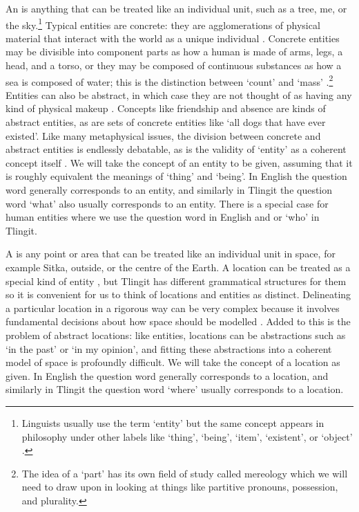 An  is anything that can be treated like an individual unit, such as a tree, me, or the sky.\footnote{Linguists usually use the term ‘entity’ but the same concept appears in philosophy under other labels like ‘thing’, ‘being’, ‘item’, ‘existent’, or ‘object’ \parencite{rettler-bailey:2017}.} Typical entities are concrete: they are agglomerations of physical material that interact with the world as a unique individual \parencite{rettler-bailey:2017}. Concrete entities may be divisible into component parts as how a human is made of arms, legs, a head, and a torso, or they may be composed of continuous substances as how a sea is composed of water; this is the distinction between ‘count’ and ‘mass’ \parencites{steen:2016}{nicolas:2018}.\footnote{The idea of a ‘part’ has its own field of study called mereology \parencite{varzi:2019} which we will need to draw upon in looking at things like partitive pronouns, possession, and plurality.} Entities can also be abstract, in which case they are not thought of as having any kind of physical makeup \parencite{rosen:2020}. Concepts like friendship and absence are kinds of abstract entities, as are sets of concrete entities like ‘all dogs that have ever existed’. Like many metaphysical issues, the division between concrete and abstract entities is endlessly debatable, as is the validity of ‘entity’ as a coherent concept itself \parencites{casati:2004}{rettler-bailey:2017}{rosen:2020}. We will take the concept of an entity to be given, assuming that it is roughly equivalent the meanings of ‘thing’ and ‘being’. In English the question word  generally corresponds to an entity, and similarly in Tlingit the question word  ‘what’ also usually corresponds to an entity. There is a special case for human entities where we use the question word  in English and  or  ‘who’ in Tlingit.

A  is any point or area that can be treated like an individual unit in space, for example Sitka, outside, or the centre of the Earth. A location can be treated as a special kind of entity \parencite{gilmore:2018}, but Tlingit has different grammatical structures for them so it is convenient for us to think of locations and entities as distinct. Delineating a particular location in a rigorous way can be very complex because it involves fundamental decisions about how space should be modelled \parencites{pederson:2012}{landau:2012}{gilmore:2018}. Added to this is the problem of abstract locations: like entities, locations can be abstractions such as ‘in the past’ or ‘in my opinion’, and fitting these abstractions into a coherent model of space is profoundly difficult. We will take the concept of a location as given. In English the question word  generally corresponds to a location, and similarly in Tlingit the question word  ‘where’ usually corresponds to a location.

